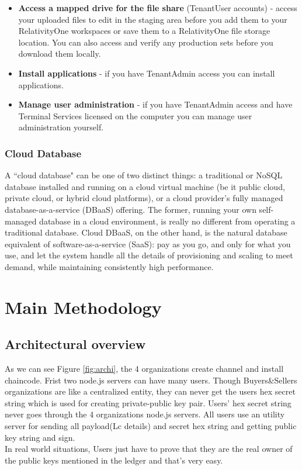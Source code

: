 \documentclass[a4paper,12pt]{report}
\begin{document}
\begin{itemize}
    \item \textbf{Access a mapped drive for the file share }(TenantUser accounts) - access your uploaded files to edit in the staging area before you add them to your RelativityOne workspaces or save them to a RelativityOne file storage location. You can also access and verify any production sets before you download them locally.
    \item \textbf{Install applications} - if you have TenantAdmin access you can install applications.
    \item \textbf{Manage user administration} - if you have TenantAdmin access and have Terminal Services licensed on the computer you can manage user administration yourself.
\end{itemize}

\subsection{Cloud Database}
A ``cloud database" can be one of two distinct things: a traditional or NoSQL database installed and running on a cloud virtual machine (be it public cloud, private cloud, or hybrid cloud platforms), or a cloud provider’s fully managed database-as-a-service (DBaaS) offering. The former, running your own self-managed database in a cloud environment, is really no different from operating a traditional database. Cloud DBaaS, on the other hand, is the natural database equivalent of software-as-a-service (SaaS): pay as you go, and only for what you use, and let the system handle all the details of provisioning and scaling to meet demand, while maintaining consistently high performance\cite{cloud}.

\chapter{Main Methodology}
\section{Architectural overview}
{\large As we can see Figure \ref{fig:archi}}, the 4 organizations create channel and install chaincode. Frist two node.js servers can have many users. Though Buyers\&Sellers organizations are like a centralized entity, they can never get the users hex secret string which is used for creating private-public key pair. Users' hex secret string never goes through the 4 organizations node.js servers. All users use an utility server for sending all payload(Lc details) and secret hex string and getting public key string and sign.\\
In real world situations, Users just have to prove that they are the real owner of the public keys mentioned in the ledger and that's very easy.
\end{document}
